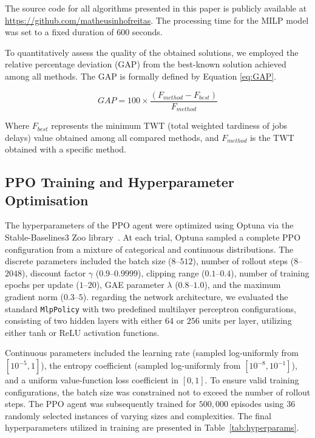 \documentclass{article}
\begin{document}
The source code for all algorithms presented in this paper is publicly available at  \url{https://github.com/matheusinhofreitas}. The processing time for the MILP model was set to a fixed duration of 600 seconds.

To quantitatively assess the quality of the obtained solutions, we employed the relative percentage deviation (GAP) from the best-known solution achieved among all methods. The GAP is formally defined by Equation \ref{eq:GAP}.

\begin{equation}
    \label{eq:GAP}
    GAP = 100\times\frac{(F_{method} - F_{best})}{F_{method}}
\end{equation} 

Where $F_{best}$ represents the minimum TWT (total weighted tardiness of jobs delays) value obtained among all compared methods, and $F_{method}$ is the TWT obtained with a specific method.

\subsection{PPO Training and Hyperparameter Optimisation}
\label{subsec:PPOtraining}

The hyperparameters of the PPO agent were optimized using Optuna via the Stable-Baselines3 Zoo library~\citep{rl-zoo3}. At each trial, Optuna sampled a complete PPO configuration from a mixture of categorical and continuous distributions. The discrete parameters included the batch size ($8$--$512$), number of rollout steps ($8$--$2048$), discount factor $\gamma$ ($0.9$--$0.9999$), clipping range ($0.1$--$0.4$), number of training epochs per update ($1$--$20$), GAE parameter $\lambda$ ($0.8$--$1.0$), and the maximum gradient norm ($0.3$--$5$). regarding the network architecture, we evaluated the standard \texttt{MlpPolicy} with two predefined multilayer perceptron configurations, consisting of two hidden layers with either $64$ or $256$ units per layer, utilizing either tanh or ReLU activation functions.

Continuous parameters included the learning rate (sampled log-uniformly from $[10^{-5}, 1]$), the entropy coefficient (sampled log-uniformly from $[10^{-8}, 10^{-1}]$), and a uniform value-function loss coefficient in $[0, 1]$. To ensure valid training configurations, the batch size was constrained not to exceed the number of rollout steps. The PPO agent was subsequently trained for $500,000$ episodes using $36$ randomly selected instances of varying sizes and complexities. The final hyperparameters utilized in training are presented in Table~\ref{tab:hyperparams}.
\end{document}
